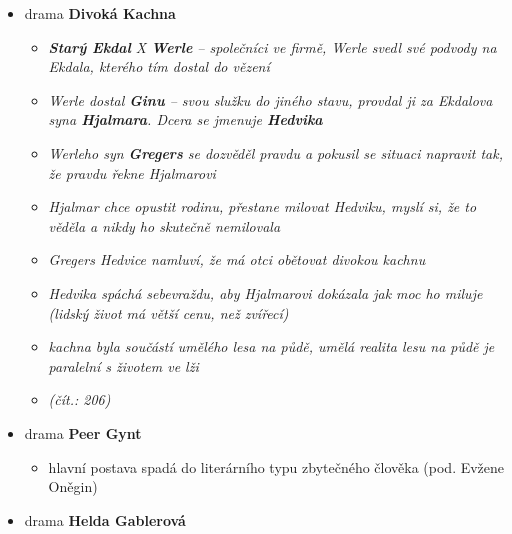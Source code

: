 \begin{itemize}
\item drama \textbf{Divoká Kachna}
	\begin{itemize}
	\item \textit{\textbf{Starý Ekdal} X \textbf{Werle} -- společníci ve firmě, Werle svedl své podvody na Ekdala, kterého tím dostal do vězení}
	\item \textit{Werle dostal \textbf{Ginu} -- svou služku do jiného stavu, provdal ji za Ekdalova syna \textbf{Hjalmara}. Dcera se jmenuje \textbf{Hedvika}}
	\item \textit{Werleho syn \textbf{Gregers} se dozvěděl pravdu a pokusil se situaci napravit tak, že pravdu řekne Hjalmarovi}
	\item \textit{Hjalmar chce opustit rodinu, přestane milovat Hedviku, myslí si, že to věděla a nikdy ho skutečně nemilovala}
	\item \textit{Gregers Hedvice namluví, že má otci obětovat divokou kachnu}
	\item \textit{Hedvika spáchá sebevraždu, aby Hjalmarovi dokázala jak moc ho miluje (lidský život má větší cenu, než zvířecí)}
	\item \textit{kachna byla součástí umělého lesa na půdě, umělá realita lesu na půdě je paralelní s životem ve lži}
	\item \textit{(čít.: 206)}
	\end{itemize}
	
\item drama \textbf{Peer Gynt}
	\begin{itemize}
	\item hlavní postava spadá do literárního typu zbytečného člověka (pod. Evžene Oněgin)
	\end{itemize}
	
\item drama \textbf{Helda Gablerová}
\end{itemize}

